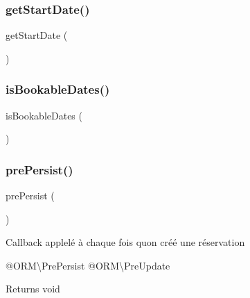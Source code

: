 \mbox{\label{class_app_1_1_entity_1_1_booking_a0c44cbed4e674365b58324212de2e05e}} 
\subsubsection{\texorpdfstring{getStartDate()}{getStartDate()}}
{\footnotesize\ttfamily get\+Start\+Date (\begin{DoxyParamCaption}{ }\end{DoxyParamCaption})}

\mbox{\label{class_app_1_1_entity_1_1_booking_a26b540da1b354196867927f9da66a077}} 
\subsubsection{\texorpdfstring{isBookableDates()}{isBookableDates()}}
{\footnotesize\ttfamily is\+Bookable\+Dates (\begin{DoxyParamCaption}{ }\end{DoxyParamCaption})}

\mbox{\label{class_app_1_1_entity_1_1_booking_aaf176bf05676d9145be294568feae3e5}} 
\subsubsection{\texorpdfstring{prePersist()}{prePersist()}}
{\footnotesize\ttfamily pre\+Persist (\begin{DoxyParamCaption}{ }\end{DoxyParamCaption})}

Callback applelé à chaque fois qu\textquotesingle{}on créé une réservation

@\+O\+RM\textbackslash{}\+Pre\+Persist @\+O\+RM\textbackslash{}\+Pre\+Update

\begin{DoxyReturn}{Returns}
void 
\end{DoxyReturn}
\mbox{\label{class_app_1_1_entity_1_1_booking_a3f7c05734d0d1dbedb3ac722e171cc12}} 

